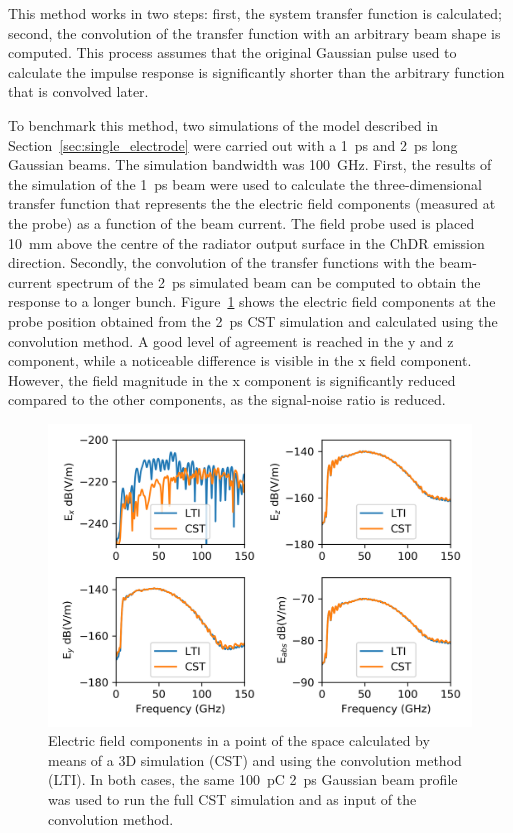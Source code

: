 This method works in two steps: first, the system transfer function is calculated; second, the convolution of the transfer function with an arbitrary beam shape is computed. This process assumes that the original Gaussian pulse used to calculate the impulse response is significantly shorter than the arbitrary function that is convolved later. 

To benchmark this method, two simulations of the model described in Section~\ref{sec:single_electrode} were carried out with a 1~ps and 2~ps long Gaussian beams. The simulation bandwidth was 100~GHz. First, the results of the simulation of the 1~ps beam were used to calculate the three-dimensional transfer function that represents the  the electric field components (measured at the probe) as a function of the beam current. The field probe used is placed 10~mm above the centre of the radiator output surface in the ChDR emission direction. Secondly, the convolution of the transfer functions with the beam-current spectrum of the 2~ps simulated beam can be computed to obtain the response to a longer bunch. Figure~\ref{fig:LTI} shows the electric field components at the probe position obtained from the 2~ps CST simulation and calculated using the convolution method. A good level of agreement is reached in the y and z component, while a noticeable difference is visible in the x field component. However, the field magnitude in the x component is significantly reduced compared to the other components, as the signal-noise ratio is reduced.




\begin{figure}[!t]
\centering
\includegraphics[scale=1, keepaspectratio]{pictures/LTI_reconstruction}
\caption{Electric field components in a point of the space calculated by means of a 3D simulation (CST) and using the convolution method (LTI). In both cases, the same 100~pC  2~ps Gaussian beam profile was used to run the full CST simulation and as input of the convolution method.
}\label{fig:LTI}
\end{figure}





